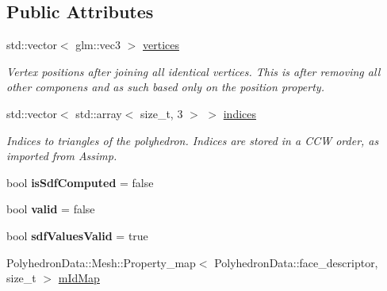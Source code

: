 \subsection*{Public Attributes}
\begin{DoxyCompactItemize}
\item 
\mbox{\label{structpepr3d_1_1_polyhedron_data_a83aa9807ec5b6b95395d281dfe788086}} 
std\+::vector$<$ glm\+::vec3 $>$ \mbox{\hyperlink{structpepr3d_1_1_polyhedron_data_a83aa9807ec5b6b95395d281dfe788086}{vertices}}
\begin{DoxyCompactList}\small\item\em Vertex positions after joining all identical vertices. This is after removing all other componens and as such based only on the position property. \end{DoxyCompactList}\item 
\mbox{\label{structpepr3d_1_1_polyhedron_data_a9cd3b6704df3fb8caae2bd938e6d7de8}} 
std\+::vector$<$ std\+::array$<$ size\+\_\+t, 3 $>$ $>$ \mbox{\hyperlink{structpepr3d_1_1_polyhedron_data_a9cd3b6704df3fb8caae2bd938e6d7de8}{indices}}
\begin{DoxyCompactList}\small\item\em Indices to triangles of the polyhedron. Indices are stored in a C\+CW order, as imported from Assimp. \end{DoxyCompactList}\item 
\mbox{\label{structpepr3d_1_1_polyhedron_data_a44da515196e97da9f68cd43c2692d516}} 
bool {\bfseries is\+Sdf\+Computed} = false
\item 
\mbox{\label{structpepr3d_1_1_polyhedron_data_addadf43cb5eedfa38cc06f097aff8c08}} 
bool {\bfseries valid} = false
\item 
\mbox{\label{structpepr3d_1_1_polyhedron_data_a46a914703d099c5f2237622309f4b4dc}} 
bool {\bfseries sdf\+Values\+Valid} = true
\item 
\mbox{\label{structpepr3d_1_1_polyhedron_data_ae8ef78643a8d1f2de16d90b3c6d401ea}} 
Polyhedron\+Data\+::\+Mesh\+::\+Property\+\_\+map$<$ Polyhedron\+Data\+::face\+\_\+descriptor, size\+\_\+t $>$ \mbox{\hyperlink{structpepr3d_1_1_polyhedron_data_ae8ef78643a8d1f2de16d90b3c6d401ea}{m\+Id\+Map}}

\end{DoxyCompactItemize}
